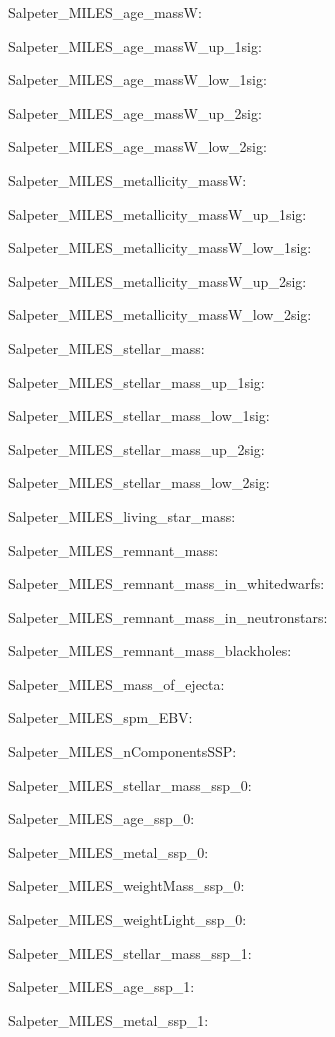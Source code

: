 \item Salpeter\_MILES\_age\_massW: 
\item Salpeter\_MILES\_age\_massW\_up\_1sig: 
\item Salpeter\_MILES\_age\_massW\_low\_1sig: 
\item Salpeter\_MILES\_age\_massW\_up\_2sig: 
\item Salpeter\_MILES\_age\_massW\_low\_2sig: 
\item Salpeter\_MILES\_metallicity\_massW: 
\item Salpeter\_MILES\_metallicity\_massW\_up\_1sig: 
\item Salpeter\_MILES\_metallicity\_massW\_low\_1sig: 
\item Salpeter\_MILES\_metallicity\_massW\_up\_2sig: 
\item Salpeter\_MILES\_metallicity\_massW\_low\_2sig: 
\item Salpeter\_MILES\_stellar\_mass: 
\item Salpeter\_MILES\_stellar\_mass\_up\_1sig: 
\item Salpeter\_MILES\_stellar\_mass\_low\_1sig: 
\item Salpeter\_MILES\_stellar\_mass\_up\_2sig: 
\item Salpeter\_MILES\_stellar\_mass\_low\_2sig: 
\item Salpeter\_MILES\_living\_star\_mass: 
\item Salpeter\_MILES\_remnant\_mass: 
\item Salpeter\_MILES\_remnant\_mass\_in\_whitedwarfs: 
\item Salpeter\_MILES\_remnant\_mass\_in\_neutronstars: 
\item Salpeter\_MILES\_remnant\_mass\_blackholes: 
\item Salpeter\_MILES\_mass\_of\_ejecta: 
\item Salpeter\_MILES\_spm\_EBV: 
\item Salpeter\_MILES\_nComponentsSSP: 
\item Salpeter\_MILES\_stellar\_mass\_ssp\_0: 
\item Salpeter\_MILES\_age\_ssp\_0: 
\item Salpeter\_MILES\_metal\_ssp\_0: 
\item Salpeter\_MILES\_weightMass\_ssp\_0: 
\item Salpeter\_MILES\_weightLight\_ssp\_0: 
\item Salpeter\_MILES\_stellar\_mass\_ssp\_1: 
\item Salpeter\_MILES\_age\_ssp\_1: 
\item Salpeter\_MILES\_metal\_ssp\_1: 

